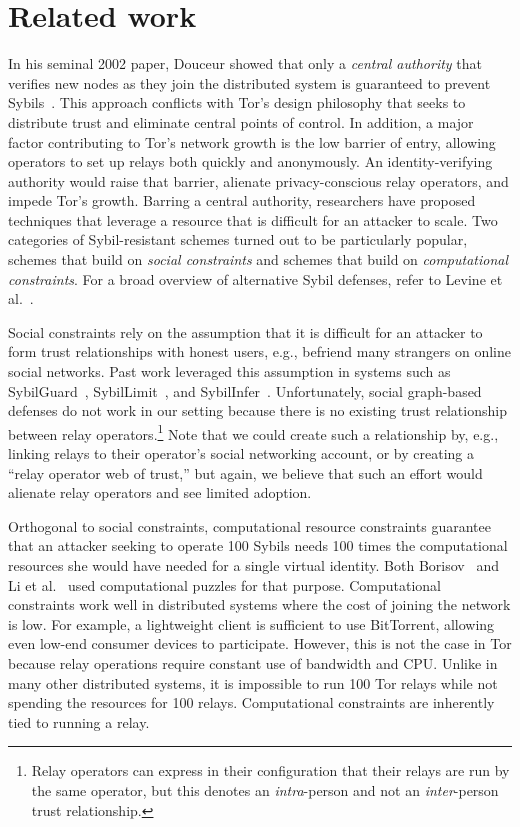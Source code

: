 \section{Related work}
\label{sec:related_work}
In his seminal 2002 paper, Douceur showed that only a \emph{central authority}
that verifies new nodes as they join the distributed system is guaranteed to
prevent Sybils~\cite{Douceur2002a}.  This approach conflicts with Tor's design
philosophy that seeks to distribute trust and eliminate central points of
control.  In addition, a major factor contributing to Tor's network growth is
the low barrier of entry, allowing operators to set up relays both quickly and
anonymously.  An identity-verifying authority would raise that barrier,
alienate privacy-conscious relay operators, and impede Tor's growth.  Barring a
central authority, researchers have proposed techniques that leverage a
resource that is difficult for an attacker to scale.  Two categories of
Sybil-resistant schemes turned out to be particularly popular, schemes that
build on \emph{social constraints} and schemes that build on
\emph{computational constraints}.  For a broad overview of alternative Sybil
defenses, refer to Levine et al.~\cite{Levine2006a}.

Social constraints rely on the assumption that it is difficult for an attacker
to form trust relationships with honest users, e.g., befriend many strangers on
online social networks.  Past work leveraged this assumption in systems such as
SybilGuard~\cite{Yu2006a}, SybilLimit~\cite{Yu2008a}, and
SybilInfer~\cite{Danezis2009a}.  Unfortunately, social graph-based defenses do
not work in our setting because there is no existing trust relationship between
relay operators.\footnote{Relay operators can express in their configuration
that their relays are run by the same operator, but this denotes an
\emph{intra}-person and not an \emph{inter}-person trust relationship.}  Note
that we could create such a relationship by, e.g., linking relays to their
operator's social networking account, or by creating a ``relay operator web of
trust,'' but again, we believe that such an effort would alienate relay
operators and see limited adoption.

Orthogonal to social constraints, computational resource constraints guarantee
that an attacker seeking to operate 100 Sybils needs 100 times the
computational resources she would have needed for a single virtual identity.
Both Borisov~\cite{Borisov2006a} and Li et al.~\cite{Li2012a} used
computational puzzles for that purpose.  Computational constraints work well in
distributed systems where the cost of joining the network is low.  For example,
a lightweight client is sufficient to use BitTorrent, allowing even low-end
consumer devices to participate.  However, this is not the case in Tor because
relay operations require constant use of bandwidth and CPU.  Unlike in many
other distributed systems, it is impossible to run 100 Tor relays while not
spending the resources for 100 relays.  Computational constraints are
inherently tied to running a relay.


